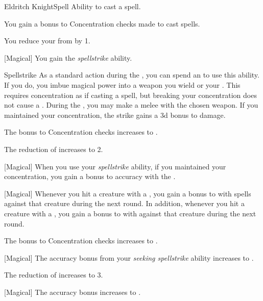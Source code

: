     \begin{feat}{Eldritch Knight}{Spell}
        \featpre Ability to cast a spell.

         You gain a  bonus to Concentration checks made to cast spells.

         You reduce your  from  by 1.

        [Magical] You gain the \textit{spellstrike} ability.
        \begin{ability}{Spellstrike}
            As a standard action during the , you can spend an  to use this ability.
            If you do, you imbue magical power into a weapon you wield or your .
            This requires concentration as if casting a spell, but breaking your concentration does not cause a .
            During the , you may make a melee  with the chosen weapon.
            If you maintained your concentration, the strike gains a \plus3d bonus to damage.
        \end{ability}

         The bonus to Concentration checks increases to .

         The reduction of  increases to 2.

        [Magical] When you use your \textit{spellstrike} ability, if you maintained your concentration, you gain a  bonus to accuracy with the .

        [Magical] Whenever you hit a creature with a , you gain a  bonus to  with spells against that creature during the next round.
        In addition, whenever you hit a creature with a , you gain a  bonus to  with  against that creature during the next round.

         The bonus to Concentration checks increases to .

        [Magical] The accuracy bonus from your \textit{seeking spellstrike} ability increases to .

         The reduction of  increases to 3.

        [Magical] The accuracy bonus increases to .
    \end{feat}

